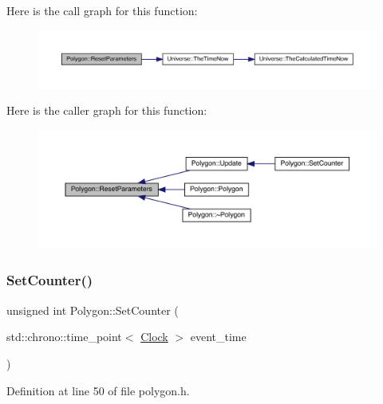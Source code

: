 Here is the call graph for this function\+:\nopagebreak
\begin{figure}[H]
\begin{center}
\leavevmode
\includegraphics[width=350pt]{class_polygon_a0e2824d12cd6b18c8b14c64ef4b2bf97_cgraph}
\end{center}
\end{figure}
Here is the caller graph for this function\+:
\nopagebreak
\begin{figure}[H]
\begin{center}
\leavevmode
\includegraphics[width=350pt]{class_polygon_a0e2824d12cd6b18c8b14c64ef4b2bf97_icgraph}
\end{center}
\end{figure}
\mbox{\label{class_polygon_a344626b07ee8dc40c71c3bec1480d2c2}} 
\subsubsection{\texorpdfstring{Set\+Counter()}{SetCounter()}\hspace{0.1cm}{\footnotesize\ttfamily [1/2]}}
{\footnotesize\ttfamily unsigned int Polygon\+::\+Set\+Counter (\begin{DoxyParamCaption}\item[{std\+::chrono\+::time\+\_\+point$<$ \hyperlink{universe_8h_a0ef8d951d1ca5ab3cfaf7ab4c7a6fd80}{Clock} $>$}]{event\+\_\+time }\end{DoxyParamCaption})\hspace{0.3cm}{\ttfamily [inline]}}



Definition at line 50 of file polygon.\+h.

